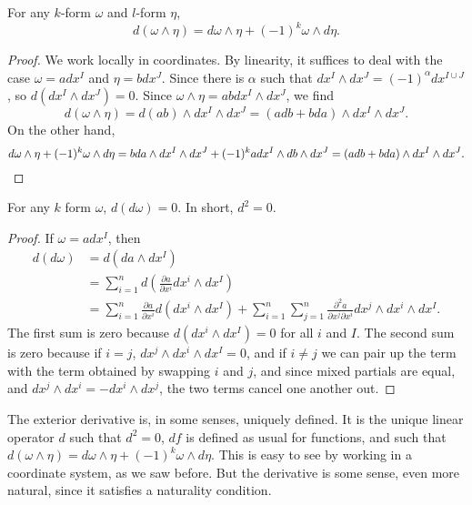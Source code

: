 \begin{theorem}
    For any $k$-form $\omega$ and $l$-form $\eta$,
    \[ d(\omega \wedge \eta) = d\omega \wedge \eta + (-1)^k \omega \wedge d\eta. \]
\end{theorem}
\begin{proof}
    We work locally in coordinates. By linearity, it suffices to deal with the case $\omega = a dx^I$ and $\eta = b dx^J$. Since there is $\alpha$ such that $dx^I \wedge dx^J = (-1)^\alpha dx^{I \cup J}$, so $d(dx^I \wedge dx^J) = 0$. Since $\omega \wedge \eta = ab dx^I \wedge dx^J$, we find
    \[ d(\omega \wedge \eta) = d(ab) \wedge dx^I \wedge dx^J = (a db + b da) \wedge dx^I \wedge dx^J. \]
    On the other hand,
    \[ d\omega \wedge \eta + (-1)^k \omega \wedge d\eta = b da \wedge dx^I \wedge dx^J + (-1)^k a dx^I \wedge db \wedge dx^J = (a db + b da) \wedge dx^I \wedge dx^J. \qedhere \]
\end{proof}

\begin{theorem}
    For any $k$ form $\omega$, $d(d\omega) = 0$. In short, $d^2 = 0$.
\end{theorem}
\begin{proof}
    If $\omega = a dx^I$, then
    \begin{align*}
        d(d\omega) &= d(da \wedge dx^I)\\
        &= \sum_{i = 1}^n d \left( \frac{\partial a}{\partial x^i} dx^i \wedge dx^I \right)\\
        &= \sum_{i = 1}^n \frac{\partial a}{\partial x^i} d(dx^i \wedge dx^I) + \sum_{i = 1}^n \sum_{j = 1}^n \frac{\partial^2 a}{\partial x^j \partial x^i} dx^j \wedge dx^i \wedge dx^I.
    \end{align*}
    The first sum is zero because $d(dx^i \wedge dx^I) = 0$ for all $i$ and $I$. The second sum is zero because if $i = j$, $dx^j \wedge dx^i \wedge dx^I = 0$, and if $i \neq j$ we can pair up the term with the term obtained by swapping $i$ and $j$, and since mixed partials are equal, and $dx^j \wedge dx^i = - dx^i \wedge dx^j$, the two terms cancel one another out.
\end{proof}

The exterior derivative is, in some senses, uniquely defined. It is the unique linear operator $d$ such that $d^2 = 0$, $df$ is defined as usual for functions, and such that $d(\omega \wedge \eta) = d\omega \wedge \eta + (-1)^k \omega \wedge d\eta$. This is easy to see by working in a coordinate system, as we saw before. But the derivative is some sense, even more natural, since it satisfies a naturality condition.

